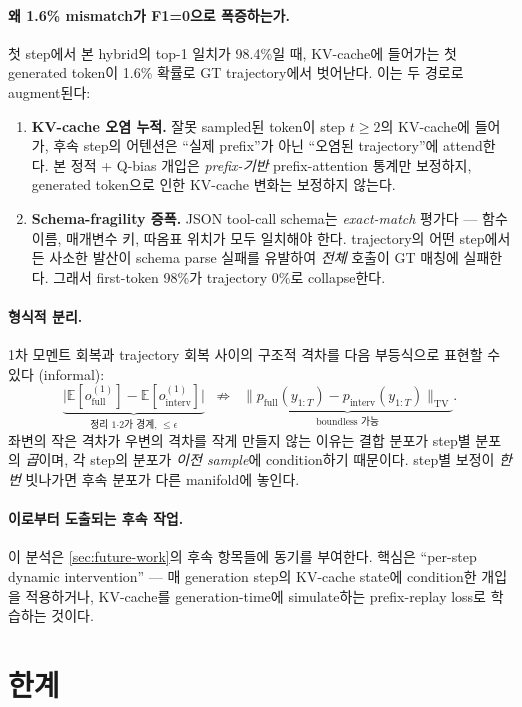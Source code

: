 \documentclass{article}
\theoremstyle{definition}
\newcommand{\E}{\mathbb{E}}
\begin{document}
\paragraph{왜 1.6\% mismatch가 F1=0으로 폭증하는가.}
첫 step에서 본 hybrid의 top-1 일치가 98.4\%일 때, KV-cache에 들어가는 첫 generated token이 1.6\% 확률로 GT trajectory에서 벗어난다. 이는 두 경로로 augment된다:
\begin{enumerate}[leftmargin=*]
\item \textbf{KV-cache 오염 누적.} 잘못 sampled된 token이 step $t \ge 2$의 KV-cache에 들어가, 후속 step의 어텐션은 ``실제 prefix''가 아닌 ``오염된 trajectory''에 attend한다. 본 정적 + Q-bias 개입은 \emph{prefix-기반} prefix-attention 통계만 보정하지, generated token으로 인한 KV-cache 변화는 보정하지 않는다.
\item \textbf{Schema-fragility 증폭.} JSON tool-call schema는 \emph{exact-match} 평가다 — 함수 이름, 매개변수 키, 따옴표 위치가 모두 일치해야 한다. trajectory의 어떤 step에서든 사소한 발산이 schema parse 실패를 유발하여 \emph{전체} 호출이 GT 매칭에 실패한다. 그래서 first-token 98\%가 trajectory 0\%로 collapse한다.
\end{enumerate}

\paragraph{형식적 분리.}
1차 모멘트 회복과 trajectory 회복 사이의 구조적 격차를 다음 부등식으로 표현할 수 있다 (informal):
\[
\underbrace{\bigl|\E[o_{\mathrm{full}}^{(1)}] - \E[o_{\mathrm{interv}}^{(1)}]\bigr|}_{\text{정리 1·2가 경계, } \le \epsilon}
\;\;\not\Rightarrow\;\;
\underbrace{\bigl\|p_{\mathrm{full}}(y_{1:T}) - p_{\mathrm{interv}}(y_{1:T})\bigr\|_{\mathrm{TV}}}_{\text{boundless 가능}}.
\]
좌변의 작은 격차가 우변의 격차를 작게 만들지 않는 이유는 결합 분포가 step별 분포의 \emph{곱}이며, 각 step의 분포가 \emph{이전 sample}에 condition하기 때문이다. step별 보정이 \emph{한 번} 빗나가면 후속 분포가 다른 manifold에 놓인다.

\paragraph{이로부터 도출되는 후속 작업.}
이 분석은 \cref{sec:future-work}의 후속 항목들에 동기를 부여한다. 핵심은 ``per-step dynamic intervention'' — 매 generation step의 KV-cache state에 condition한 개입을 적용하거나, KV-cache를 generation-time에 simulate하는 prefix-replay loss로 학습하는 것이다.

\section{한계}
\label{sec:limits}
\end{document}
